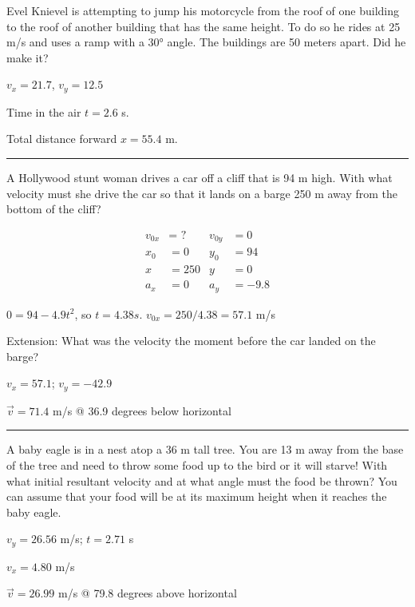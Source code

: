 \documentclass[12pt]{exam}
\begin{document}
\def\mystrut{\protect\rule[-2.2ex]{0ex}{2.2ex}} 
\qformat{ \textbf{Task \#\thequestion}
  \ifthenelse{\equal{\thequestion}{\thequestiontitle}}
    {}
    {: \emph{\thequestiontitle}}
  \mystrut  \hfill}
\begin{questions}

\question
  Evel Knievel is attempting to jump his motorcycle from the roof of one building to the roof of another building that has the same height.  To do so he rides at 25 m/s and uses a ramp with a 30° angle.  The buildings are 50 meters apart.  Did he make it?

  \begin{solution}
    $v_x=21.7$, $v_y=12.5$
    
    Time in the air $t=2.6$ s.

    Total distance forward $x=55.4$ m.
  \end{solution}
  

\vs \hrule \vs

\question

  A Hollywood stunt woman drives a car off a cliff that is 94 m high.  With what velocity must she drive the car so that it lands on a barge 250 m away from the bottom of the cliff?

  \begin{solution}
    \begin{align*}
      v_{0x} &= \text{ ?} &   v_{0y} &= 0\\
      x_0 &= 0            &   y_0 &= 94\\
      x &= 250            &   y &= 0\\
      a_x &= 0            &   a_y &= -9.8
    \end{align*}

    $0=94-4.9t^2$, so $t = 4.38 s$.  $v_{0x}=250/4.38=57.1$ m/s

    Extension: What was the velocity the moment before the car landed on the barge?

    $v_x= 57.1$; $v_y= -42.9$
    
    $\vec{v} = 71.4$ m/s @ 36.9 degrees below horizontal


  \end{solution}





  \vs \hrule \vs

\question
  A baby eagle is in a nest atop a 36 m tall tree.  You are 13 m away from the base of the tree and need to throw some food up to the bird or it will starve!  With what initial resultant velocity and at what angle must the food be thrown?  You can assume that your food will be at its maximum height when it reaches the baby eagle.

  \begin{solution}
    $v_y=26.56$ m/s; $t=2.71$ s

    $v_x=4.80$ m/s

    $\vec{v}=26.99$ m/s @ 79.8 degrees above horizontal
  \end{solution}

\end{questions}
\end{document}
